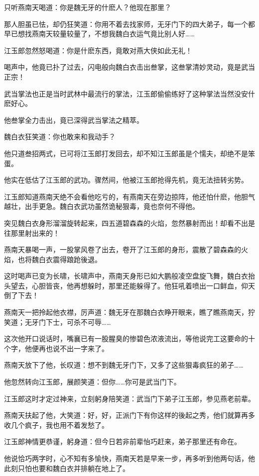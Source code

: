\documentclass[12pt,oneside]{book}
\begin{document}
只听燕南天喝道：你是魏无牙的什麽人？他现在那里？

那人胆虽已怯，却仍狂笑道：你用不着去找家师，无牙门下的四大弟子，每一个都早已想找燕南天较量较量了，不想我魏白衣运气竟比别人好\ldots\ldots{}

江玉郎忽然怒喝道：你是什麽东西，竟敢对燕大侠如此无礼！

喝声中，他竟已扑了过去，闪电般向魏白衣击出叁掌，这叁掌清妙灵动，竟是武当正宗！

武当掌法也正是当时武林中最流行的掌法，江玉郎偷偷练好了这种掌法当然没安什麽好心。

他叁掌全力击出，竟已深得武当掌法之精萃。

魏白衣狂笑道：你也敢来和我动手？

他只道叁招两式，已可将江玉郎打发回去，却不知江玉郎虽是个懦夫，却绝不是笨蛋。

他实在低估了江玉郎的武功。骤然间，他被江玉郎抢得先机，竟无法扭转劣势。

江玉郎知道燕南天绝不会看他吃亏的，有燕南天在旁边掠阵，他还怕什麽，他胆气越壮，出手更急。魏白衣武功虽然诡秘狠毒，竟也奈何不得他。

突见魏白衣身形溜溜旋转起来，四五道碧森森的火焰，忽然暴射而出！却看不出是往那里射出来的！

燕南天暴喝一声，一股掌风卷了出去，卷开了江玉郎的身形，震散了碧森森的火焰，也将魏白衣震得踉跄後退。

这时喝声已变为长啸，长啸声中，燕南天身形已如大鹏般凌空盘旋飞舞，魏白衣抬头望去，心胆皆丧，他再想躲时，那里还能躲得了。他狂吼着喷出一口鲜血，仰天倒了下去！

燕南天一把拎起他衣襟，厉声道：魏无牙在那魏白衣睁开眼来，瞧了瞧燕南天，狞笑道；无牙门下士，可杀不可辱\ldots\ldots{}

这次他开口说话时，嘴襄已有一股腥臭的惨碧色浓液流出，等他说完工这要命的十个字，他便再也说不出一字来了。

燕南天放下了他，长叹道：想不到魏无牙门下，又多了这些狠毒疯狂的弟子\ldots\ldots{}

他忽然转向江玉郎，展颜笑道：但你\ldots\ldots 你可是武当门下。

江玉郎这时才定过神来，立刻躬身陪笑道：武当门下弟子江玉郎，参见燕老前辈。

燕南天扶起了他，大笑道：好，好，正派门下有你这样的後起之秀，他们就算再多收几个疯子，我也用不着发愁了。

江玉郎神情更恭谨，躬身道：但今日若非前辈怡巧赶来，弟子那里还有命在。

他说恰巧两字时，心不知有多愉快，燕南天若是早来一步，再多听到他两句话，他此刻只怕也要和魏白衣并排躺在地上了。
\end{document}
